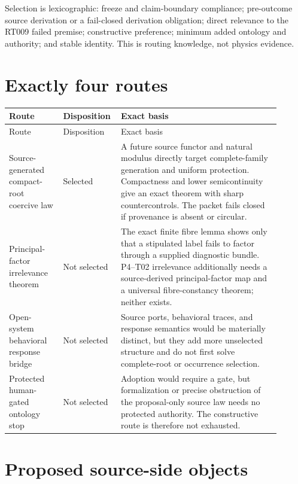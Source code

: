 \documentclass[11pt]{article}
\begin{document}
Selection is lexicographic: freeze and claim-boundary compliance; pre-outcome
source derivation or a fail-closed derivation obligation; direct relevance to
the RT009 failed premise; constructive preference; minimum added ontology and
authority; and stable identity.  This is routing knowledge, not physics
evidence.

\section{Exactly four routes}

\begin{longtable}{P{0.19\linewidth}P{0.15\linewidth}P{0.56\linewidth}}
\toprule
Route & Disposition & Exact basis \\
\midrule
\endfirsthead
\toprule
Route & Disposition & Exact basis \\
\midrule
\endhead
Source-generated compact-root coercive law & Selected & A future source
functor and natural modulus directly target complete-family generation and
uniform protection.  Compactness and lower semicontinuity give an exact
theorem with sharp countercontrols.  The packet fails closed if provenance is
absent or circular. \\
Principal-factor irrelevance theorem & Not selected & The exact finite
fibre lemma shows only that a stipulated label fails to factor through a
supplied diagnostic bundle.  P4--T02 irrelevance additionally needs a
source-derived principal-factor map and a universal fibre-constancy theorem;
neither exists. \\
Open-system behavioral response bridge & Not selected & Source ports,
behavioral traces, and response semantics would be materially distinct, but
they add more unselected structure and do not first solve complete-root or
occurrence selection. \\
Protected human-gated ontology stop & Not selected & Adoption would require
a gate, but formalization or precise obstruction of the proposal-only source
law needs no protected authority.  The constructive route is therefore not
exhausted. \\
\bottomrule
\end{longtable}

\section{Proposed source-side objects}
\end{document}
